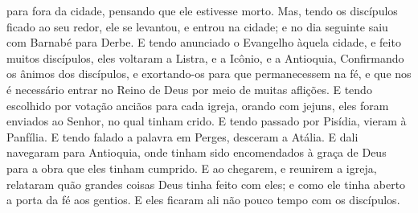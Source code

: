 {{} para fora da cidade, pensando que ele estivesse morto.
  Mas, tendo os discípulos ficado ao seu redor, ele se levantou, e entrou na cidade; e no dia seguinte saiu com Barnabé para Derbe.
  E tendo anunciado o Evangelho àquela cidade, e feito muitos discípulos, eles voltaram a Listra, e a Icônio, e a Antioquia,
  Confirmando os ânimos dos discípulos, e exortando-os para que permanecessem na fé, e que nos é necessário entrar no Reino de Deus por meio de muitas aflições.
  E tendo escolhido por votação anciãos
 para cada igreja, orando com jejuns, eles foram enviados ao Senhor, no qual tinham crido.
  E tendo passado por Pisídia, vieram à Panfília.
  E tendo falado a palavra em Perges, desceram a Atália.
  E dali navegaram para Antioquia, onde tinham sido encomendados à graça de Deus para a obra que eles
{} tinham cumprido.
  E ao chegarem, e reunirem a igreja, relataram quão grandes coisas Deus tinha feito com eles; e como ele tinha aberto a porta da fé aos gentios.
  E eles ficaram ali não pouco tempo com os discípulos.
\par }


